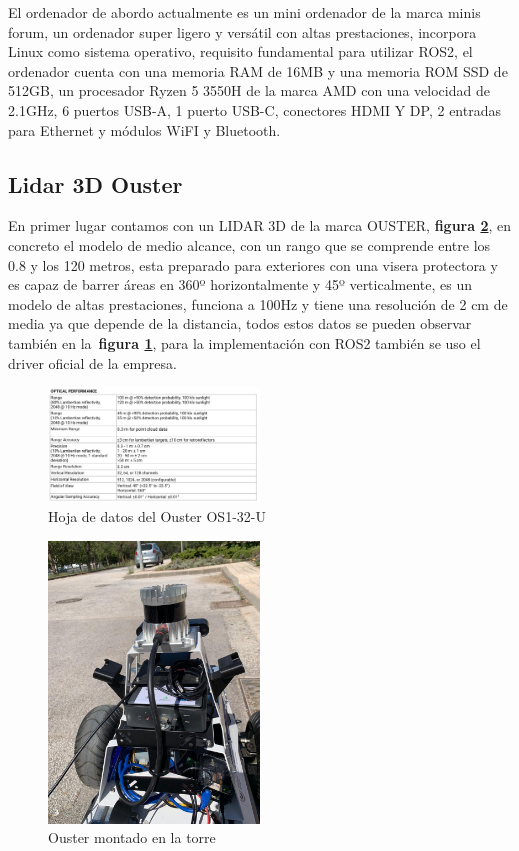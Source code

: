 El ordenador de abordo actualmente es un mini ordenador de la marca minis forum, un ordenador super ligero y versátil con altas 
prestaciones, incorpora Linux como sistema operativo, requisito fundamental para utilizar ROS2, el ordenador cuenta con una 
memoria RAM de 16MB y una memoria ROM SSD de 512GB, un procesador Ryzen 5 3550H de la marca AMD con una velocidad de 2.1GHz, 6 puertos USB-A, 
1 puerto USB-C, conectores HDMI Y DP, 2 entradas para Ethernet y módulos WiFI y Bluetooth.

\subsection{Lidar 3D Ouster}
En primer lugar contamos con un LIDAR 3D de la marca OUSTER, \textbf{figura \ref{fig:ouster_hunter}}, en concreto el 
modelo de medio alcance, con un rango que se comprende entre los 0.8 y los 120 metros, esta preparado para exteriores con una visera 
protectora y es capaz de barrer áreas en 360º horizontalmente y 45º verticalmente, es un modelo de altas prestaciones, funciona a 
100Hz y tiene una resolución de 2 cm de media ya que depende de la distancia, todos estos datos se pueden observar también en la~\textbf{figura \ref{fig:datasheet_ouster}}, 
para la implementación con ROS2 también se uso el driver oficial de la empresa. 

\begin{figure}[h]
    \centering
    \includegraphics[width=0.5\textwidth]{images/osuter_datasheet.png}
    \caption{Hoja de datos del Ouster OS1-32-U}
    \label{fig:datasheet_ouster}
\end{figure}

\begin{figure}[H]
    \centering
    \includegraphics[width=0.5\textwidth]{images/ouster_hunter.jpeg}
    \caption{Ouster montado en la torre}
    \label{fig:ouster_hunter}
\end{figure}

